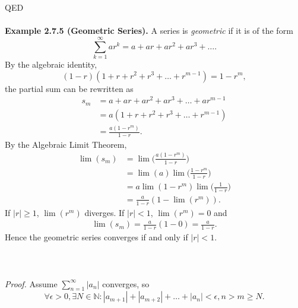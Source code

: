 \documentclass{article}
\begin{document}
            QED\\ \\ 
            \textbf{Example 2.7.5 (Geometric Series).} A series is \textit{geometric} if it is of the form
            \begin{equation*}
                \sum_{k=1}^\infty ar^k = a + ar + ar^2 + ar^3 + \dots .
            \end{equation*}
            By the algebraic identity,
            \begin{equation*}
                (1-r)(1+r+r^2+r^3+\dots+r^{m-1})=1-r^m,
            \end{equation*}
            the partial sum can be rewritten as
            \begin{align*}
                s_m & = a + ar + ar^2 + ar^3 + \dots + ar^{m-1} \\ & = a(1+r+r^2+r^3+\dots+r^{m-1}) \\
                & = \frac{a(1-r^m)}{1-r}.
            \end{align*}
            By the Algebraic Limit Theorem,
            \begin{align*}
            \lim(s_m) & = \lim \bigg(\frac{a(1-r^m)}{1-r}\bigg) \\
            & = \lim(a) \lim \bigg(\frac{1-r^m}{1-r}\bigg) \\
            & = a \lim(1-r^m) \lim \bigg(\frac{1}{1-r}\bigg) \\
            & = \frac{a}{1-r}(1-\lim(r^m)).
            \end{align*}
            If $|r| \geq 1$, $\lim(r^m)$ diverges. If $|r|<1$, $\lim(r^m)=0$ and 
            \begin{align*}
                \lim(s_m) = \frac{a}{1-r}(1-0) = \frac{a}{1-r}.
            \end{align*}
            Hence the geometric series converges if and only if $|r| < 1$.
            \\ \\
            \\ \\
            \textit{Proof.} Assume $\sum_{n=1}^\infty |a_n|$ converges, so
            \begin{equation*}
                \forall \epsilon >0, \exists N \in \mathbb{N}: |a_{m+1}| + |a_{m+2}| + \dots + |a_n| < \epsilon, n > m \geq N.
            \end{equation*}
\end{document}
